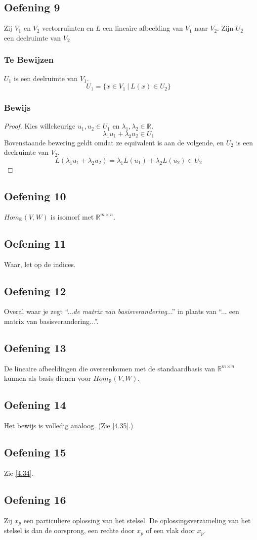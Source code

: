 \documentclass[lineaire_algebra_oplossingen.tex]{subfiles}
\begin{document}
\subsection{Oefening 9}
Zij $V_1$ en $V_2$ vectorruimten en $L$ een lineaire afbeelding van $V_1$ naar $V_2$. Zijn $U_2$ een deelruimte van $V_2$

\subsubsection*{Te Bewijzen}
$U_1$ is een deelruimte van $V_1$.
\[
U_1 = \{x \in V_1\ |\  L(x) \in U_2 \}
\]

\subsubsection*{Bewijs}
\begin{proof}
Kies willekeurige $u_1, u_2 \in U_1$ en $\lambda_1,\lambda_2 \in \mathbb{R}$.
\[
\lambda_1u_1 + \lambda_2u_2 \in U_1
\]
Bovenstaande bewering geldt omdat ze equivalent is aan de volgende, en $U_2$ is een deelruimte van $V_2$.
\[
L(\lambda_1u_1 + \lambda_2u_2)
=\lambda_1L(u_1) + \lambda_2L(u_2)
 \in U_2
\]
\end{proof}

\subsection{Oefening 10}
$Hom_{\mathbb{R}}(V,W)$ is isomorf met $\mathbb{R}^{m\times n}$.

\subsection{Oefening 11}
Waar, let op de indices.

\subsection{Oefening 12}
Overal waar je zegt ``...\emph{de matrix van basisverandering}...'' in plaats van ``... een matrix van basisverandering...''.

\subsection{Oefening 13}
De lineaire afbeeldingen die overeenkomen met de standaardbasis van $\mathbb{R}^{m\times n}$ kunnen als basis dienen voor $Hom_\mathbb{R}(V,W)$.

\subsection{Oefening 14}
Het bewijs is volledig analoog. (Zie \ref{4.35}.)

\subsection{Oefening 15}
Zie \ref{4.34}.

\subsection{Oefening 16}
Zij $x_p$ een particuliere oplossing van het stelsel.
De oplossingsverzameling van het stelsel is dan de oorsprong,  een rechte door $x_p$ of een vlak door $x_p$.
\end{document}
